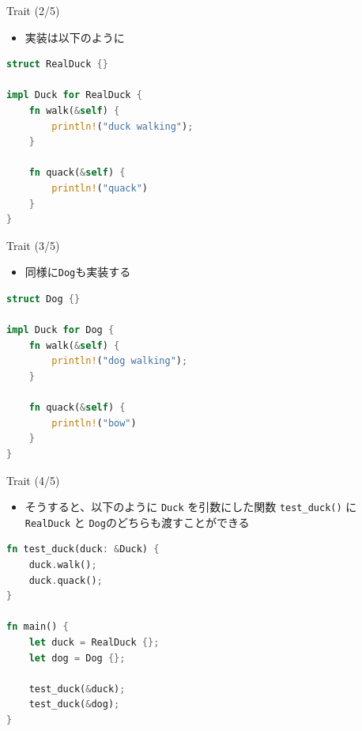 \documentclass[cjk,dvipdfmx,10pt,compress,fragile%
hyperref={bookmarks=true,bookmarksnumbered=true,bookmarksopen=false,%
colorlinks=false,%
pdftitle={第 134 回 関西 Debian 勉強会},%
pdfauthor={小林},%
pdfsubject={資料},%
}]{beamer}
\begin{document}
\begin{frame}[t,fragile]{Trait (2/5)}
\begin{itemize}
 \item 実装は以下のように
\end{itemize}
\begin{lstlisting}[language=Rust,style=boxed,style=colouredRust,basicstyle=\small\tt,lineskip=-2pt]
struct RealDuck {}

impl Duck for RealDuck {
    fn walk(&self) {
        println!("duck walking");
    }

    fn quack(&self) {
        println!("quack")
    }
}\end{lstlisting}
\end{frame}

\begin{frame}[t,fragile]{Trait (3/5)}
\begin{itemize}
 \item 同様に\texttt{Dog}も実装する
\end{itemize}
\begin{lstlisting}[language=Rust,style=boxed,style=colouredRust,basicstyle=\small\tt,lineskip=-2pt]
struct Dog {}

impl Duck for Dog {
    fn walk(&self) {
        println!("dog walking");
    }

    fn quack(&self) {
        println!("bow")
    }
}\end{lstlisting}
\end{frame}

\begin{frame}[t,fragile]{Trait (4/5)}
\begin{itemize}
 \item そうすると、以下のように \texttt{Duck} を引数にした関数 \verb|test_duck()| に\\
       \texttt{RealDuck} と \texttt{Dog}のどちらも渡すことができる
\end{itemize}
\begin{lstlisting}[language=Rust,style=boxed,style=colouredRust,basicstyle=\small\tt,lineskip=-2pt]
fn test_duck(duck: &Duck) {
    duck.walk();
    duck.quack();
}

fn main() {
    let duck = RealDuck {};
    let dog = Dog {};

    test_duck(&duck);
    test_duck(&dog);
}\end{lstlisting}
\end{frame}
\end{document}
